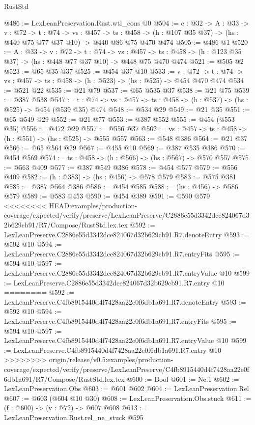 \begin{lexlean}{RustStd}
\begin{coremodule}
{\begin{coremodule}
@486 := LexLeanPreservation.Rust.wtl_cons @0
@504 := {c : @32} ->
  {A : @33} ->
  {v : @72} ->
  {t : @74} ->
  {vs : @457} ->
  {ts : @458} -> (h : @107 @35 @37) -> (hs : @440 @75 @77 @37 @10) -> @440 @86 @75 @470 @474
@505 := @486 @1
@520 := {A : @33} ->
  {v : @72} ->
  {t : @74} ->
  {vs : @457} -> {ts : @458} -> (h : @123 @35 @37) -> (hs : @448 @77 @37 @10) -> @448 @75 @470 @474
@521 := @505 @2
@523 := @65 @35 @37
@525 := @454 @37 @10
@533 := {v : @72} ->
  {t : @74} -> {vs : @457} -> {ts : @458} -> (h : @523) -> (hs : @525) -> @454 @470 @474
@534 := @521 @22
@535 := @21 @79
@537 := @65 @535 @37
@538 := @21 @75
@539 := @387 @538
@547 := {t : @74} -> {vs : @457} -> {ts : @458} -> (h : @537) -> (hs : @525) -> @454 (@539 @35) @474
@548 := @534 @29
@549 := @21 @35
@551 := @65 @549 @29
@552 := @21 @77
@553 := @387 @552
@555 := @454 (@553 @35)
@556 := @472 @29
@557 := @556 @37
@562 := {vs : @457} -> {ts : @458} -> (h : @551) -> (hs : @525) -> @555 @557
@563 := @548 @386
@564 := @21 @37
@566 := @65 @564 @29
@567 := @455 @10
@569 := @387 @535 @386
@570 := @454 @569
@574 := {ts : @458} -> (h : @566) -> (hs : @567) -> @570 @557
@575 := @563 @409
@577 := @387 @549 @386
@578 := @454 @577
@579 := @556 @409
@582 := (h : @383) -> (hs : @456) -> @578 @579
@583 := @575 @381
@585 := @387 @564 @386
@586 := @454 @585
@588 := (hs : @456) -> @586 @579
@589 := @583 @453
@590 := @454 @389
@591 := @590 @579
<<<<<<<< HEAD:examples/production-coverage/expected/verify/preserve/LexLeanPreserve/C2886e55d3342dce824067d32b629cb91/R7/Compose/RustStd.lex.tex
@592 := LexLeanPreserve.C2886e55d3342dce824067d32b629cb91.R7.denoteEntry
@593 := @592 @10
@594 := LexLeanPreserve.C2886e55d3342dce824067d32b629cb91.R7.entryFits
@595 := @594 @10
@597 := LexLeanPreserve.C2886e55d3342dce824067d32b629cb91.R7.entryValue @10
@599 := LexLeanPreserve.C2886e55d3342dce824067d32b629cb91.R7.entry @10
========
@592 := LexLeanPreserve.C4fb8915440d4f7428aa22e0f6db1a691.R7.denoteEntry
@593 := @592 @10
@594 := LexLeanPreserve.C4fb8915440d4f7428aa22e0f6db1a691.R7.entryFits
@595 := @594 @10
@597 := LexLeanPreserve.C4fb8915440d4f7428aa22e0f6db1a691.R7.entryValue @10
@599 := LexLeanPreserve.C4fb8915440d4f7428aa22e0f6db1a691.R7.entry @10
>>>>>>>> origin/release/v0.5:examples/production-coverage/expected/verify/preserve/LexLeanPreserve/C4fb8915440d4f7428aa22e0f6db1a691/R7/Compose/RustStd.lex.tex
@600 := Bool
@601 := Ne.{1}
@602 := LexLeanPreservation.Obs
@603 := @601 @602
@604 := LexLeanPreservation.Rel
@607 := @603 (@604 @10 @30)
@608 := LexLeanPreservation.Obs.stuck
@611 := (f : @600) -> (v : @72) -> @607 @608
@613 := LexLeanPreservation.Rust.rel_ne_stuck @595

\end{coremodule}}
\end{coremodule}
\end{lexlean}

